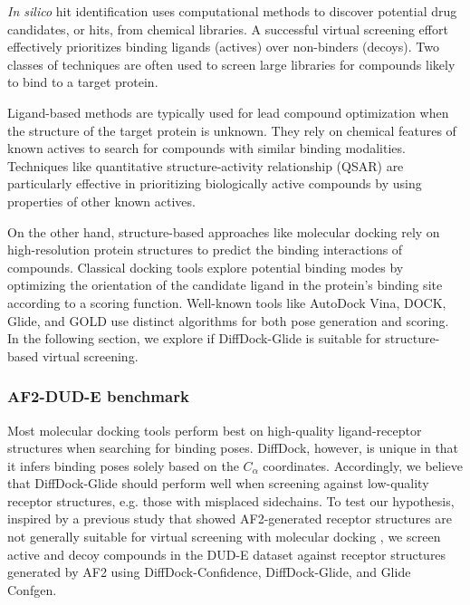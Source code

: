 \documentclass[letterpaper]{article}
\begin{document}
{\it In silico} hit identification uses computational methods to discover potential drug candidates, or hits, from chemical libraries. A successful virtual screening effort effectively prioritizes binding ligands (actives) over non-binders (decoys). Two classes of techniques are often used to 
screen large libraries for compounds likely to bind to a target protein. 

Ligand-based methods are typically used for lead compound optimization when the structure of the target protein is unknown. They rely on chemical features of known actives to search for compounds with similar binding modalities. Techniques like quantitative structure-activity relationship (QSAR) are particularly effective in prioritizing biologically active compounds by using properties of other known actives. {\cite{molecules18010735}}

On the other hand, structure-based approaches like molecular docking rely on high-resolution protein structures to predict the binding interactions of compounds.  Classical docking tools explore potential binding modes by optimizing the orientation of the candidate ligand in the protein's binding site according to a scoring function. Well-known tools like AutoDock Vina\cite{trott2010autodock,eberhardt2021autodock}, DOCK\cite{allen2015dock}, Glide\cite{friesner2004glide}, and GOLD\cite{verdonk2003gold} use distinct algorithms for both pose generation and scoring.\cite{scirep2023} In the following section, we explore if DiffDock-Glide is suitable for structure-based virtual screening.

\subsubsection{AF2-DUD-E benchmark}

Most molecular docking tools perform best on high-quality ligand-receptor structures when searching for binding poses. DiffDock, however, is unique in that it infers binding poses solely based on the $C_\alpha$ coordinates. Accordingly, we believe that DiffDock-Glide should perform well when screening against low-quality receptor structures, e.g. those with misplaced sidechains. To test our hypothesis, inspired by a previous study that showed AF2-generated receptor structures are not generally suitable for virtual screening with molecular docking \cite{zhang2023benchmarking}, we screen active and decoy compounds in the DUD-E dataset against receptor structures generated by AF2 using DiffDock-Confidence, DiffDock-Glide, and Glide Confgen.
\end{document}
